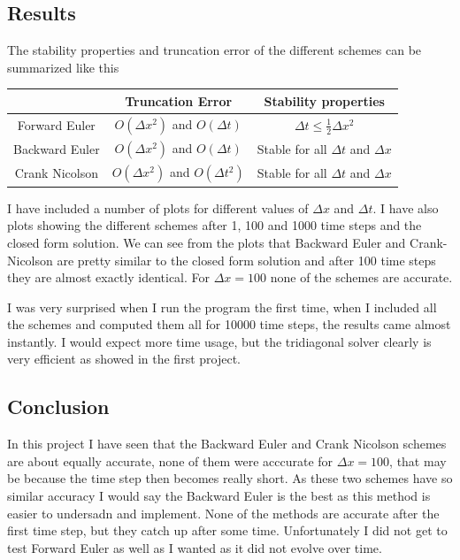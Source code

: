 \documentclass[a4wide,12pt]{article}
\begin{document}
\subsection*{Results}
The stability properties and truncation error of the different schemes can be summarized like this

\begin{tabular}{|c|c|c|}
 \hline
 & Truncation Error & Stability properties \\ \hline
Forward Euler & $O(\Delta x^{2})$ and $O(\Delta t)$ & $\Delta t \leq \frac{1}{2}\Delta x^{2}$ \\ \hline
Backward Euler & $O(\Delta x^{2})$ and $O(\Delta t)$ & Stable for all $\Delta t$ and $\Delta x$ \\ \hline
Crank Nicolson & $O(\Delta x^{2})$ and $O(\Delta t^{2})$ & Stable for all $\Delta t$ and $\Delta x$ \\ \hline
\end{tabular}

I have included a number of plots for different values of $\Delta x$ and $\Delta t$. 
I have also plots showing the different schemes after 1, 100 and 1000 time steps and the closed form solution. 
We can see from the plots that Backward Euler and Crank-Nicolson are pretty similar to the closed form solution and after 100 time steps they are almost exactly identical. For $\Delta x = 100$ none of the schemes are accurate. 

I was very surprised when I run the program the first time, when I included all the schemes and computed them all for 10000 time steps, the results came almost instantly. I would expect more time usage, but the tridiagonal solver clearly is very efficient as showed in the first project. 

\subsection*{Conclusion}
In this project I have seen that the Backward Euler and Crank Nicolson schemes are about equally accurate, none of them were acccurate for $\Delta x = 100$, that may be because the time step then becomes really short. 
As these two schemes have so similar accuracy I would say the Backward Euler is the best as this method is easier to undersadn and implement. 
None of the methods are accurate after the first time step, but they catch up after some time. Unfortunately I did not get to test Forward Euler as well as I wanted as it did not evolve over time. 
\end{document}
